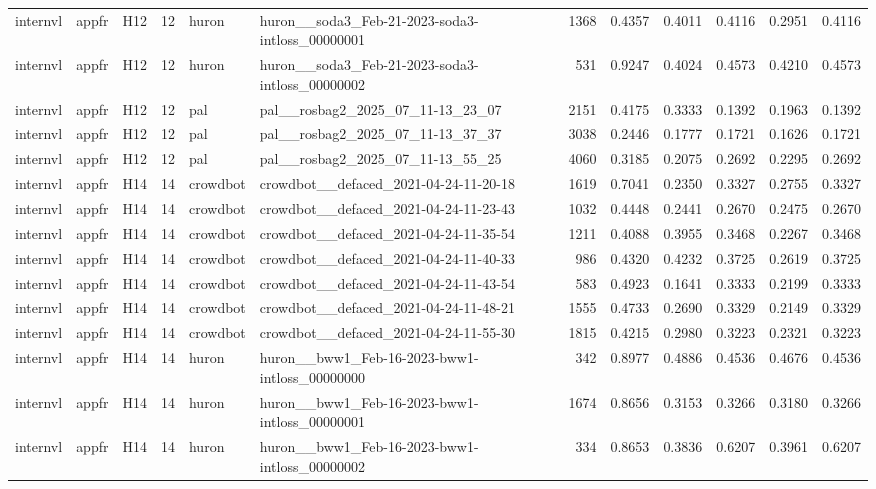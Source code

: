 \begin{table}[tbp]
\begin{tabular}{lllrllrrrrrr}
internvl & appfr & H12 & 12 & huron & huron\_\_soda3\_Feb-21-2023-soda3-intloss\_00000001 & 1368 & 0.4357 & 0.4011 & 0.4116 & 0.2951 & 0.4116 \\
internvl & appfr & H12 & 12 & huron & huron\_\_soda3\_Feb-21-2023-soda3-intloss\_00000002 & 531 & 0.9247 & 0.4024 & 0.4573 & 0.4210 & 0.4573 \\
internvl & appfr & H12 & 12 & pal & pal\_\_rosbag2\_2025\_07\_11-13\_23\_07 & 2151 & 0.4175 & 0.3333 & 0.1392 & 0.1963 & 0.1392 \\
internvl & appfr & H12 & 12 & pal & pal\_\_rosbag2\_2025\_07\_11-13\_37\_37 & 3038 & 0.2446 & 0.1777 & 0.1721 & 0.1626 & 0.1721 \\
internvl & appfr & H12 & 12 & pal & pal\_\_rosbag2\_2025\_07\_11-13\_55\_25 & 4060 & 0.3185 & 0.2075 & 0.2692 & 0.2295 & 0.2692 \\
internvl & appfr & H14 & 14 & crowdbot & crowdbot\_\_defaced\_2021-04-24-11-20-18 & 1619 & 0.7041 & 0.2350 & 0.3327 & 0.2755 & 0.3327 \\
internvl & appfr & H14 & 14 & crowdbot & crowdbot\_\_defaced\_2021-04-24-11-23-43 & 1032 & 0.4448 & 0.2441 & 0.2670 & 0.2475 & 0.2670 \\
internvl & appfr & H14 & 14 & crowdbot & crowdbot\_\_defaced\_2021-04-24-11-35-54 & 1211 & 0.4088 & 0.3955 & 0.3468 & 0.2267 & 0.3468 \\
internvl & appfr & H14 & 14 & crowdbot & crowdbot\_\_defaced\_2021-04-24-11-40-33 & 986 & 0.4320 & 0.4232 & 0.3725 & 0.2619 & 0.3725 \\
internvl & appfr & H14 & 14 & crowdbot & crowdbot\_\_defaced\_2021-04-24-11-43-54 & 583 & 0.4923 & 0.1641 & 0.3333 & 0.2199 & 0.3333 \\
internvl & appfr & H14 & 14 & crowdbot & crowdbot\_\_defaced\_2021-04-24-11-48-21 & 1555 & 0.4733 & 0.2690 & 0.3329 & 0.2149 & 0.3329 \\
internvl & appfr & H14 & 14 & crowdbot & crowdbot\_\_defaced\_2021-04-24-11-55-30 & 1815 & 0.4215 & 0.2980 & 0.3223 & 0.2321 & 0.3223 \\
internvl & appfr & H14 & 14 & huron & huron\_\_bww1\_Feb-16-2023-bww1-intloss\_00000000 & 342 & 0.8977 & 0.4886 & 0.4536 & 0.4676 & 0.4536 \\
internvl & appfr & H14 & 14 & huron & huron\_\_bww1\_Feb-16-2023-bww1-intloss\_00000001 & 1674 & 0.8656 & 0.3153 & 0.3266 & 0.3180 & 0.3266 \\
internvl & appfr & H14 & 14 & huron & huron\_\_bww1\_Feb-16-2023-bww1-intloss\_00000002 & 334 & 0.8653 & 0.3836 & 0.6207 & 0.3961 & 0.6207 \\

\end{tabular}
\end{table}
